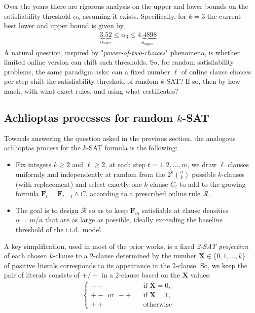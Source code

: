 \documentclass[11pt,reqno]{amsart}
\numberwithin{equation}{section}
\renewcommand{\vec}[1]{\boldsymbol{#1}}
\newcommand\vF{\vec F}
\newcommand\vX{\vec X}
\begin{document}
	Over the years there are rigorous analysis on the upper and lower bounds on the satisfiability threshold $\alpha_{k}$ assuming it exists.
	Specifically, for $k=3$ the current best lower  \cite{HS,KKL} and upper bound \cite{DB}  is given by,
	\begin{align*}
		\underbrace{3.52}_{\alpha_{\text{lower}}}\leq \alpha_{3}\leq \underbrace{4.4898}_{\alpha_{\text{upper}}}
	\end{align*}
	A natural question, inspired by "\emph{power-of-two-choices}" phenomena, is whether limited online version can shift such thresholds.
	So, for random satisfiability problems, the same paradigm asks: can a fixed number $\ell$ of online clause choices per step shift the satisfiability threshold of random 
	$k$-SAT? 
	If so, then by how much, with what exact rules, and using what certificates?
	
	\subsection{Achlioptas processes for random $k$-SAT}\label{sec_achlioptas}
	Towards answering the question asked in the previous section, the analogous achlioptas process for the $k$-SAT formula is the following: 
	\begin{itemize}
		\renewcommand{\labelitemi}{\scriptsize$\blacksquare$}
		\item Fix integers $k\ge 2$ and $\ell\ge 2$, at each step $t=1,2,\ldots,m$, we draw $\ell$ clauses uniformly and independently at random from the $2^{k}\binom{n}{k}$ possible $k$-clauses (with replacement) and select exactly one $k$-clause $C_t$ to add to the growing formula $\vF_t=\vF_{t-1} \land C_t$ according to a prescribed online rule $\mathcal{R}$. 
		
		\item The goal is to design $\mathcal{R}$ so as to keep $\vF_m$ satisfiable at clause densities $\alpha=m/n$ that are as large as possible, ideally exceeding the baseline threshold of the i.i.d.\ model.
	\end{itemize}
	A key simplification, used in most of the prior works, is a fixed \emph{2-SAT projection} of each chosen $k$-clause to a 2-clause determined by the number $\vX\in\{0,1,\ldots,k\}$ of positive literals corresponds to its appearance in the $2$-clause.
	So, we keep the pair of literals consists of $+/-$ in a $2$-clause based on the $\vX$ values: 
	\begin{align}\label{eq_X}
		\begin{cases}
			--  \quad &\mbox{if $\vX=0$},\\
			+- ~~\mbox{or}~~ -+  \quad &\mbox{if $\vX=1$},\\
			++   &\mbox{otherwise}		
		\end{cases}
	\end{align}
	
\end{document}

